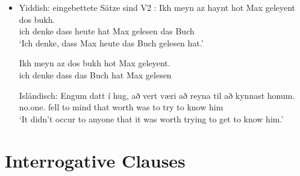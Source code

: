 


\begin{itemize}
\item Yiddish: eingebettete Sätze sind V2 \citep[]{Diesing90a}:
\eal
\ex
\gll Ikh meyn  az   haynt hot Max geleyent dos bukh.\footnotemark\\
     ich   denke dass heute hat Max gelesen   das Buch\\
\glt `Ich denke, dass Max heute das Buch gelesen hat.'

\ex%
\gll Ikh meyn  az   dos bukh hot Max geleyent.\\
     ich denke dass das Buch hat Max gelesen\\

\zl


Isländisch:
\ea 
\gll Engum         datt í hug,  að   vert  væri að reyna til     að kynnast honum.\footnotemark\\
     no.one.\DAT{} fell to mind that worth was  to try   \PREP{} to know    him\\%
{}
\glt `It didn't occur to anyone that it was worth trying to get to know him.'
\z



\end{itemize}





\section{Interrogative Clauses}




